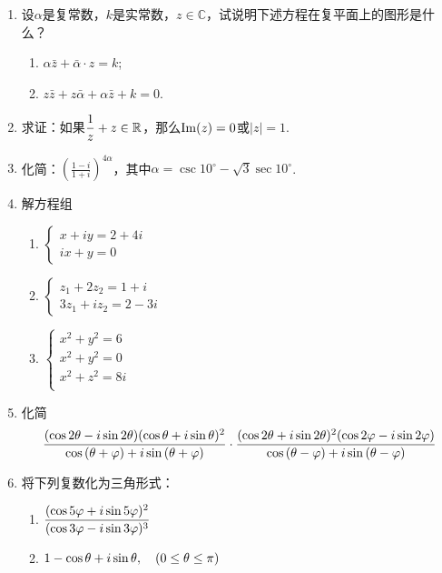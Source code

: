 \begin{enumerate}
\item 设$\alpha$是复常数，$k$是实常数，$z\in\mathbb{C}$，试说明下述方程在复平面上的图形是什么？
\begin{multicols}{2}
\begin{enumerate}[(1)]
    \item $\alpha\bar z+\bar\alpha\cdot z=k$;
    \item $z\bar z+z\bar\alpha+\alpha\bar z+k=0$.
\end{enumerate}
\end{multicols}
\item 求证：如果$\dfrac{1}{z}+z\in\mathbb{R}$，那么${\rm Im}(z)=0$或$|z|=1$.
\item 化简：$\left(\frac{1-i}{1+i}\right)^{4\alpha}$，其中$\alpha=\csc10^{\circ}-\sqrt{3}\sec10^{\circ}$.
\item 解方程组
\begin{multicols}{2}
\begin{enumerate}[(1)]
    \item $\begin{cases}
        x+iy=2+4i\\ ix+y=0
    \end{cases}$
    \item $\begin{cases}
        z_1+2z_2=1+i\\  3z_1+iz_2=2-3i
    \end{cases}$
    \item $\begin{cases}
x^2+y^2=6\\        
x^2+y^2=0\\        
x^2+z^2=8i\\        
    \end{cases}$
\end{enumerate}
\end{multicols}

\item 化简
\[\dfrac{(\cos2\theta-i\sin2\theta)(\cos{\theta}+i\sin{\theta})^2}{\cos\left(\theta+\varphi\right)+i\sin\left(\theta+\varphi\right)}\cdot \dfrac{(\cos{2\theta}+i\sin{2\theta})^2(\cos2\varphi-i\sin2\varphi)}{\cos\left(\theta-\varphi\right)+i\sin\left(\theta-\varphi\right)}\]

\item 将下列复数化为三角形式：
\begin{multicols}{2}
\begin{enumerate}[(1)]
    \item $\dfrac{(\cos{5\varphi}+i\sin{5\varphi})^2}{(\cos3\varphi-i\sin3\varphi)^3}$
    \item $1-\cos{\theta}+i\sin{\theta},\quad (0\le\theta\le\pi)$
\end{enumerate}
\end{multicols}


\end{enumerate}
